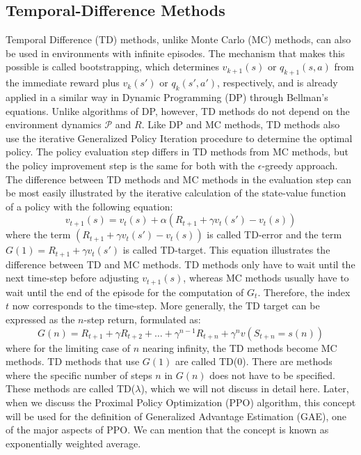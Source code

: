\documentclass[../xlapes02]{subfiles}
\begin{document}
    \subsection{Temporal-Difference Methods}\label{subsec:temporal-difference-methods}
    Temporal Difference (TD) methods, unlike Monte Carlo (MC) methods, can also be used in environments with infinite episodes. The mechanism that makes this possible is called bootstrapping, which determines $v_{k+1}(s)$ or $q_{k+1}(s,a)$ from the immediate reward plus $v_k(s')$ or $q_k(s',a')$, respectively, and is already applied in a similar way in Dynamic Programming (DP) through Bellman's equations. Unlike algorithms of DP, however, TD methods do not depend on the environment dynamics $\mathcal{P}$ and $R$. Like DP and MC methods, TD methods also use the iterative Generalized Policy Iteration procedure to determine the optimal policy. The policy evaluation step differs in TD methods from MC methods, but the policy improvement step is the same for both with the $\epsilon$-greedy approach. The difference between TD methods and MC methods in the evaluation step can be most easily illustrated by the iterative calculation of the state-value function of a policy with the following equation:
    \[
        v_{t+1}(s) = v_t(s) + \alpha(R_{t+1} + \gamma v_t(s') - v_t(s))
    \]
    where the term $(R_{t+1} + \gamma v_t(s') - v_t(s))$ is called TD-error and the term $G(1) = R_{t+1} + \gamma v_t(s')$ is called TD-target. This equation illustrates the difference between TD and MC methods. TD methods only have to wait until the next time-step before adjusting $v_{t+1}(s)$, whereas MC methods usually have to wait until the end of the episode for the computation of $G_t$. Therefore, the index $t$ now corresponds to the time-step. More generally, the TD target can be expressed as the $n$-step return, formulated as:
    \[
        G(n) = R_{t+1} + \gamma R_{t+2} + \ldots + \gamma^{n-1} R_{t+n} + \gamma^n v(S_{t+n} = s(n))
    \]
    where for the limiting case of $n$ nearing infinity, the TD methods become MC methods. TD methods that use $G(1)$ are called TD(0). There are methods where the specific number of steps $n$ in $G(n)$ does not have to be specified. These methods are called TD($\lambda$), which we will not discuss in detail here. Later, when we discuss the Proximal Policy Optimization (PPO) algorithm, this concept will be used for the definition of Generalized Advantage Estimation (GAE), one of the major aspects of PPO. We can mention that the concept is known as exponentially weighted average.
\end{document}

